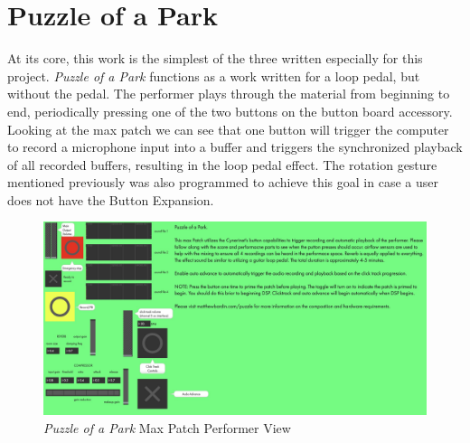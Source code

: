 \section{Puzzle of a Park}
At its core, this work is the simplest of the three written especially for this project. \textit{Puzzle of a Park} functions as a work written for a loop pedal, but without the pedal. The performer plays through the material from beginning to end, periodically pressing one of the two buttons on the button board accessory. Looking at the max patch we can see that one button will trigger the computer to record a microphone input into a buffer and triggers the synchronized playback of all recorded buffers, resulting in the loop pedal effect. The rotation gesture mentioned previously was also programmed to achieve this goal in case a user does not have the Button Expansion.

\begin{figure}
    \centering
    \includegraphics[scale=0.2]{diagrams/maxPatches/puzzlePresentation.jpg}
    \caption{\textit{Puzzle of a Park} Max Patch Performer View}
    \label{fig:puzzlePatchPres}
\end{figure}


